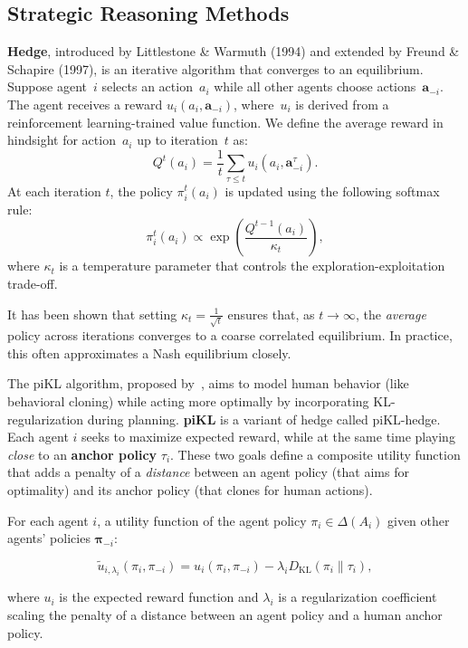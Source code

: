 \documentclass[oneside]{memoir}
\begin{document}
\subsection{Strategic Reasoning Methods}
\label{sec:cicero_reason}

\textbf{Hedge}, introduced by Littlestone \& Warmuth (1994) and extended by Freund \& Schapire (1997), is an iterative algorithm that converges to an equilibrium. Suppose agent~$i$ selects an action~$a_i$ while all other agents choose actions~$\mathbf{a}_{-i}$. The agent receives a reward $u_i(a_i, \mathbf{a}_{-i})$, where~$u_i$ is derived from a reinforcement learning-trained value function. We define the average reward in hindsight for action~$a_i$ up to iteration~$t$ as:
\[
Q^t(a_i) = \frac{1}{t} \sum_{\tau \leq t} u_i(a_i, \mathbf{a}_{-i}^\tau).
\]
At each iteration $t$, the policy $\pi_i^t(a_i)$ is updated using the following softmax rule:
\[
\pi_i^t(a_i) \propto \exp\left( \frac{Q^{t-1}(a_i)}{\kappa_t} \right),
\]
where $\kappa_t$ is a temperature parameter that controls the exploration-exploitation trade-off.

It has been shown that setting $\kappa_t = \frac{1}{\sqrt{t}}$ ensures that, as $t \rightarrow \infty$, the \textit{average} policy across iterations converges to a coarse correlated equilibrium. In practice, this often approximates a Nash equilibrium closely.

The piKL algorithm, proposed by~\cite{bakhtin2023mastering}, aims to model human behavior (like behavioral cloning) while acting more optimally by incorporating KL-regularization during planning. \textbf{piKL} is a variant of hedge called piKL-hedge. Each agent $i$ seeks to maximize expected reward, while at the same time playing \textit{close} to an \textbf{anchor policy} $\tau_i$. These two goals define a composite utility function that adds a penalty of a \textit{distance} between an agent policy (that aims for optimality) and its anchor policy (that clones for human actions).

For each agent $i$, a utility function of the agent policy $\pi_i \in \Delta(A_i)$ given other agents' policies $\mathbf{\pi}_{-i}$:

\[
\tilde{u}_{i,\lambda_i}(\pi_i, \pi_{-i}) = u_i(\pi_i, \pi_{-i}) - \lambda_i D_{\mathrm{KL}}(\pi_i \parallel \tau_i),
\]

where $u_i$ is the expected reward function and $\lambda_i$ is a regularization coefficient scaling the penalty of a distance between an agent policy and a human anchor policy.
\end{document}
